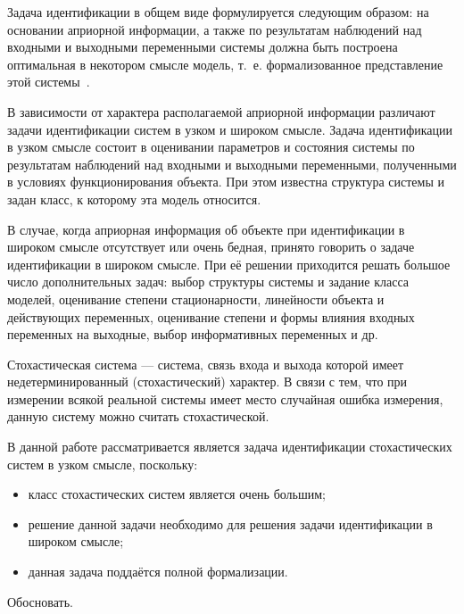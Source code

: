 Задача идентификации в общем виде формулируется следующим образом:
на основании априорной информации, а также по результатам наблюдений над
входными и выходными переменными системы должна быть построена оптимальная в
некотором смысле модель, т.~е. формализованное представление этой системы~\cite{eikhoff_1975}.

В зависимости от характера располагаемой априорной информации различают
задачи идентификации систем в узком и широком смысле.
Задача идентификации в узком смысле состоит в оценивании параметров и
состояния системы по результатам наблюдений над входными и выходными переменными,
полученными в условиях функционирования объекта.
При этом известна структура системы и задан класс, к которому эта модель относится.

В случае, когда априорная информация об объекте при идентификации в широком смысле отсутствует
или очень бедная, принято говорить о задаче идентификации в широком смысле.
При её решении приходится решать большое число дополнительных задач:
выбор структуры системы и задание класса моделей,
оценивание степени стационарности, линейности объекта и действующих переменных,
оценивание степени и формы влияния входных переменных на выходные,
выбор информативных переменных и др.

Стохастическая система --- система, связь входа и выхода которой имеет недетерминированный
(стохастический) характер. В связи с тем, что при измерении всякой реальной системы имеет место
случайная ошибка измерения, данную систему можно считать стохастической.

В данной работе рассматривается является задача идентификации стохастических систем в
узком смысле, поскольку:
\begin{itemize}
\item класс стохастических систем является {\color{red} очень большим};
\item решение данной задачи необходимо для решения задачи идентификации в широком смысле;
\item данная задача поддаётся полной формализации.
\end{itemize}

{\color{red} Обосновать.}

\pagebreak

